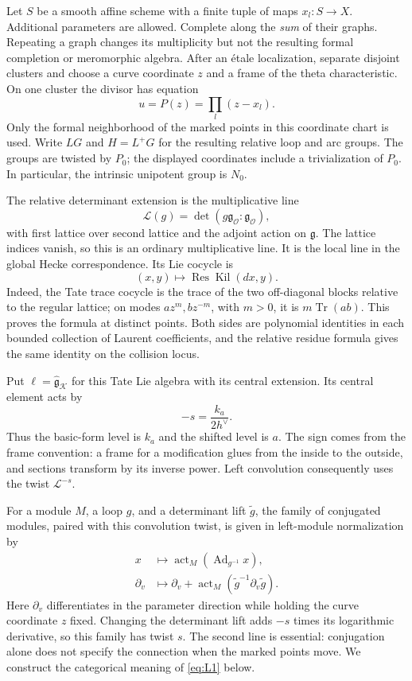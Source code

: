 \documentclass[11pt]{article}
\numberwithin{equation}{section}
\theoremstyle{definition}
\theoremstyle{remark}
\begin{document}
Let $S$ be a smooth affine scheme with a finite tuple of maps $x_l:S\to X$.
Additional parameters are allowed.  Complete along the \emph{sum} of their
graphs.  Repeating a graph changes its multiplicity but not the resulting
formal completion or meromorphic algebra.  After an \'etale localization,
separate disjoint clusters and choose a curve coordinate $z$ and a frame
of the theta characteristic.  On one cluster the divisor has equation
\[
                 u=P(z)=\prod_l(z-x_l).
\]
Only the formal neighborhood of the marked points in this coordinate
chart is used.  Write $LG$ and $H=L^+G$ for the resulting relative loop and
arc groups.  The groups are twisted by $P_0$; the displayed coordinates
include a trivialization of $P_0$.  In particular, the intrinsic unipotent
group is $N_0$.

The relative determinant extension is the multiplicative line
\[
     \mathcal L(g)=\det(g\mathfrak g_{\mathcal O}:\mathfrak g_{\mathcal O}),
\]
with first lattice over second lattice and the adjoint action on
$\mathfrak g$.  The lattice indices vanish, so this is an ordinary
multiplicative line.  It is the local line in the global Hecke
correspondence.  Its Lie cocycle is
\[
                       (x,y)\longmapsto
                       \operatorname{Res}\operatorname{Kil}(dx,y).
\]
Indeed, the Tate trace cocycle is the trace of the two off-diagonal
blocks relative to the regular lattice; on modes $az^m,bz^{-m}$, with
$m>0$, it is $m\operatorname{Tr}(ab)$.  This proves the formula at distinct
points.  Both sides are polynomial identities in each bounded collection
of Laurent coefficients, and the relative residue formula gives the same
identity on the collision locus.

Put $\ell=\widehat{\mathfrak g}_{\mathcal K}$ for this Tate Lie algebra
with its central extension.  Its central element acts by
\[
                         -s=\frac{k_a}{2h^\vee}.
\]
Thus the basic-form level is $k_a$ and the shifted level is $a$.  The
sign comes from the frame convention: a frame for a modification glues
from the inside to the outside, and sections transform by its inverse
power.  Left convolution consequently uses the twist $\mathcal L^{-s}$.

For a module $M$, a loop $g$, and a determinant lift $\widetilde g$, the
family of conjugated modules, paired with this convolution twist, is
given in left-module normalization by
\begin{equation}\label{eq:L1}
 \begin{split}
 x&\longmapsto\operatorname{act}_M(\operatorname{Ad}_{g^{-1}}x),\\
 \partial_v&\longmapsto\partial_v+
       \operatorname{act}_M(\widetilde g^{-1}\partial_v\widetilde g).
 \end{split}
\end{equation}
Here $\partial_v$ differentiates in the parameter direction while holding
the curve coordinate $z$ fixed.  Changing the determinant lift adds
$-s$ times its logarithmic derivative, so this family has twist $s$.
The second line is essential: conjugation alone does not specify the
connection when the marked points move.  We construct the categorical
meaning of \eqref{eq:L1} below.
\end{document}
